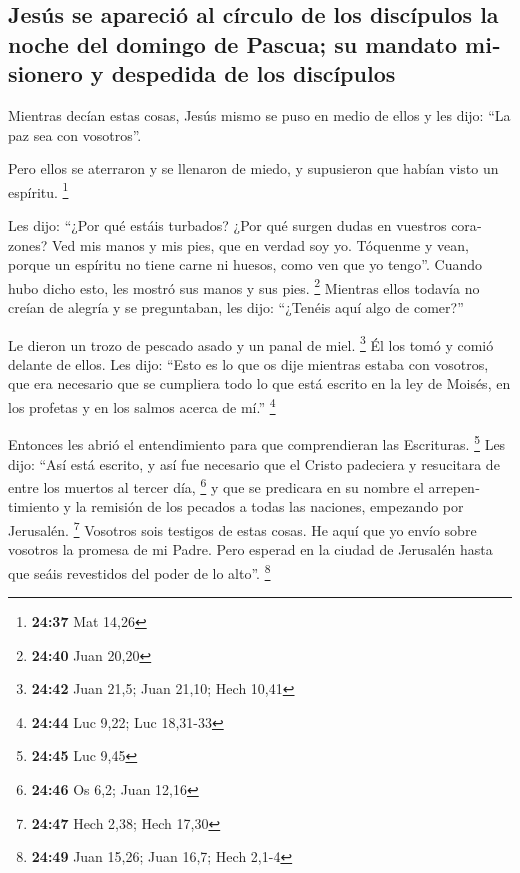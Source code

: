 \begin{paracol}{2}
\begin{otherlanguage}{english}
\hypertarget{jesuxfas-se-apareciuxf3-al-cuxedrculo-de-los-discuxedpulos-la-noche-del-domingo-de-pascua-su-mandato-misionero-y-despedida-de-los-discuxedpulos}{%
\subsection{Jesús se apareció al círculo de los discípulos la noche del
domingo de Pascua; su mandato misionero y despedida de los
discípulos}\label{jesuxfas-se-apareciuxf3-al-cuxedrculo-de-los-discuxedpulos-la-noche-del-domingo-de-pascua-su-mandato-misionero-y-despedida-de-los-discuxedpulos}}

 Mientras decían estas cosas, Jesús mismo se puso en
medio de ellos y les dijo: ``La paz sea con vosotros''.

 Pero ellos se aterraron y se llenaron de miedo, y
supusieron que habían visto un espíritu. \footnote{\textbf{24:37} Mat
  14,26}

 Les dijo: ``¿Por qué estáis turbados? ¿Por qué surgen
dudas en vuestros corazones?  Ved mis manos y mis pies,
que en verdad soy yo. Tóquenme y vean, porque un espíritu no tiene carne
ni huesos, como ven que yo tengo''.  Cuando hubo dicho
esto, les mostró sus manos y sus pies. \footnote{\textbf{24:40} Juan
  20,20}  Mientras ellos todavía no creían de alegría y
se preguntaban, les dijo: ``¿Tenéis aquí algo de comer?''

 Le dieron un trozo de pescado asado y un panal de miel.
\footnote{\textbf{24:42} Juan 21,5; Juan 21,10; Hech 10,41}
 Él los tomó y comió delante de ellos. 
Les dijo: ``Esto es lo que os dije mientras estaba con vosotros, que era
necesario que se cumpliera todo lo que está escrito en la ley de Moisés,
en los profetas y en los salmos acerca de mí.'' \footnote{\textbf{24:44}
  Luc 9,22; Luc 18,31-33}

 Entonces les abrió el entendimiento para que
comprendieran las Escrituras. \footnote{\textbf{24:45} Luc 9,45}
 Les dijo: ``Así está escrito, y así fue necesario que el
Cristo padeciera y resucitara de entre los muertos al tercer día,
\footnote{\textbf{24:46} Os 6,2; Juan 12,16}  y que se
predicara en su nombre el arrepentimiento y la remisión de los pecados a
todas las naciones, empezando por Jerusalén. \footnote{\textbf{24:47}
  Hech 2,38; Hech 17,30}  Vosotros sois testigos de estas
cosas.  He aquí que yo envío sobre vosotros la promesa de
mi Padre. Pero esperad en la ciudad de Jerusalén hasta que seáis
revestidos del poder de lo alto''. \footnote{\textbf{24:49} Juan 15,26;
  Juan 16,7; Hech 2,1-4}


\end{otherlanguage}
\end{paracol}

